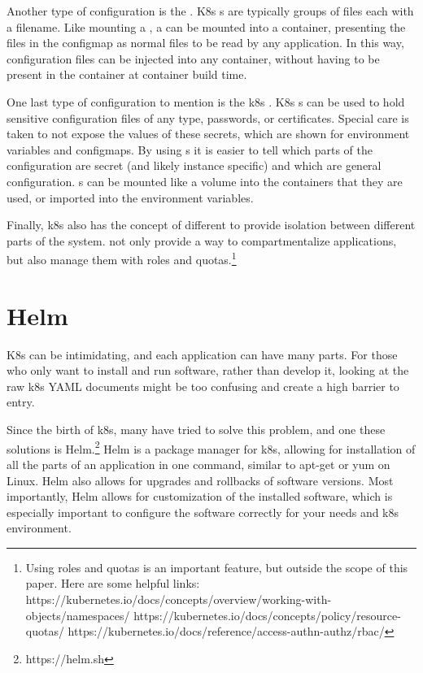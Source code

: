 \documentclass[11pt,twoside]{article}
\begin{document}
Another type of configuration is the .  K8s s are typically
groups of files each with a filename.  Like mounting a , a 
can be mounted into a container, presenting the files in the configmap as normal files to be
read by any application.  In this way, configuration files can be injected into any container,
without having to be present in the container at container build time.

One last type of configuration to mention is the k8s .  K8s s can
be used to hold sensitive configuration files of any type, passwords, or certificates.  Special
care is taken to not expose the values of these secrets, which are shown for
environment variables and configmaps.  By using s it is easier to tell which
parts of the configuration are secret (and likely instance specific) and which are general
configuration.  s can be mounted like a volume into the containers
that they are used, or imported into the environment variables.

Finally, k8s also has the concept of different  to provide isolation between
different parts of the system.   not only provide a way to
compartmentalize applications, but also manage them with roles and quotas.\footnote{
Using roles and quotas is an important feature, but outside the scope of this paper.  Here are some helpful links:
https://kubernetes.io/docs/concepts/overview/working-with-objects/namespaces/
https://kubernetes.io/docs/concepts/policy/resource-quotas/ https://kubernetes.io/docs/reference/access-authn-authz/rbac/}

\section{Helm}

K8s can be intimidating, and each application can have many parts.  For those who only 
want to install and run software, rather than develop it, looking at the raw
k8s YAML documents might be too confusing and create a high barrier to entry.

Since the birth of k8s, many have tried to solve this problem, and one these
solutions is Helm.\footnote{https://helm.sh}  Helm is a package manager for k8s, allowing
for installation of all the parts of an application in one command, similar to apt-get
or yum on Linux.  Helm also allows for upgrades and rollbacks of software versions.
Most importantly, Helm allows for customization of the installed software, which is
especially important to configure the software correctly for your needs and k8s environment.
\end{document}
